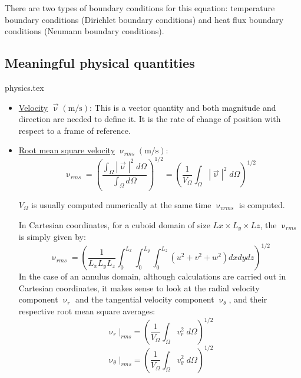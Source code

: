 There are two types of boundary conditions for this equation: temperature boundary conditions (Dirichlet boundary conditions) and heat flux boundary conditions (Neumann boundary conditions). 

\newpage
\subsection{Meaningful physical quantities}
\begin{flushright} {\tiny {\color{gray} physics.tex}} \end{flushright}

\begin{itemize}
\item \underline{Velocity} $\vec \upnu (\text{m/s})$: This is a vector quantity and both magnitude and direction are needed to define it. It is the rate of change of position with respect to a frame of reference.
\item \underline{Root mean square velocity} $\upnu_{rms} (\text{m/s})$: 
\begin{equation}
\upnu_{rms} = \left ( \frac{\int_\Omega |{\vec \upnu}|^2 \;  d \Omega}{\int_\Omega d\Omega }  \right )^{1/2}
=\left ( \frac{1}{V_\Omega} \int_\Omega |{\vec \upnu}|^2 \;  d \Omega \right )^{1/2} \label{eqVrms}
\end{equation}
\begin{remark}
$V_\Omega$ is usually computed numerically at the same time $\upnu_{vrms}$ is computed.
\end{remark}
In Cartesian coordinates, for a cuboid domain of size $Lx\times L_y \times Lz$, 
the $\upnu_{rms}$ is simply given by:
\begin{equation}
\upnu_{rms}  = \left ( \frac{1}{L_xL_yL_z} \int_0^{L_x}\int_0^{L_y}\int_0^{L_z} 
(u^2 + v^2 + w^2) dxdydz  \right )^{1/2}
\end{equation}
In the case of an annulus domain, although calculations are carried out 
in Cartesian coordinates, it makes sense
to look at the radial velocity component $\upnu_r$ and the tangential velocity 
component $\upnu_\theta$, and their respective
root mean square averages:
\begin{equation}
\upnu_r|_{rms}  =\left ( \frac{1}{V_\Omega} \int_\Omega v_r^2 \;  d \Omega \right )^{1/2} \label{eqVrVrms}
\end{equation}
\begin{equation}
\upnu_\theta|_{rms}  = \left ( \frac{1}{V_\Omega} \int_\Omega v_\theta^2 \;  d \Omega \right )^{1/2} \label{eqThetaVrms}
\end{equation}



\end{itemize}
